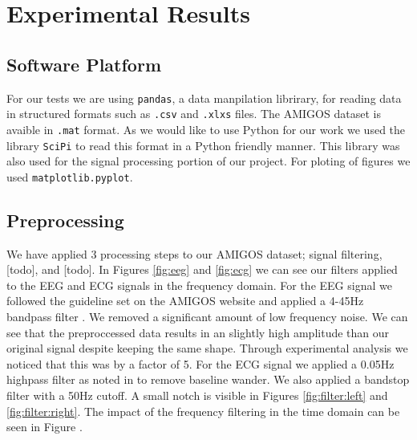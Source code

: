 \section{Experimental Results}
\label{sec:experimental_results}
\subsection{Software Platform}
For our tests we are using \texttt{pandas},
a data manpilation librirary,
for reading data in structured formats such as
\texttt{.csv} and \texttt{.xlxs} files.
The AMIGOS dataset is avaible in \texttt{.mat} format.
As we would like to use Python for our work we used
the library \texttt{SciPi} to read this format in a Python friendly manner.
This library was also used for the signal processing portion of our project.
For ploting of figures we used \texttt{matplotlib.pyplot}.


\FloatBarrier
\subsection{Preprocessing}
We have applied 3 processing steps to our AMIGOS dataset;
signal filtering, [todo], and [todo].
In Figures \ref{fig:eeg} and \ref{fig:ecg}
we can see our filters applied to the EEG and ECG signals in the frequency domain.
For the EEG signal we followed the guideline set on the AMIGOS
website and applied a 4-45Hz bandpass filter \cite{AMIGOS:2018}.
We removed a significant amount of low frequency noise.
We can see that the preproccessed data results
in an slightly high amplitude than our original signal despite keeping the same shape.
Through experimental analysis we noticed that this was by a factor of 5.
For the ECG signal we applied a 0.05Hz highpass filter as noted in
\cite{SantamariaGranados:2019}
to remove baseline wander.
We also applied a bandstop filter with a 50Hz cutoff.
A small notch is visible in
Figures \ref{fig:filter:left} and \ref{fig:filter:right}.
The impact of the frequency filtering in the time domain can be seen in Figure
\label{fig:ecg:time}.

\clearpage
